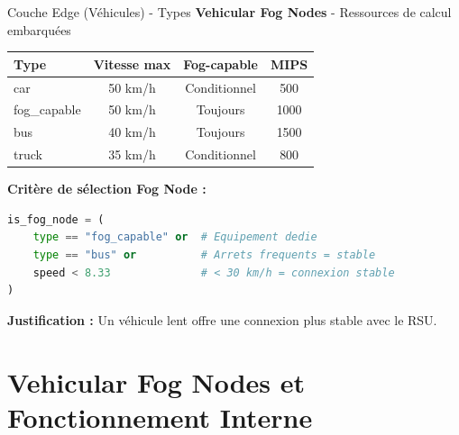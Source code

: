 ﻿\documentclass[aspectratio=169,11pt]{beamer}
\begin{document}
\begin{frame}[fragile]{Couche Edge (V\'ehicules) - Types}
\textbf{Vehicular Fog Nodes} - Ressources de calcul embarqu\'ees

\begin{table}
\centering
\begin{tabular}{lccc}
\toprule
\textbf{Type} & \textbf{Vitesse max} & \textbf{Fog-capable} & \textbf{MIPS} \\
\midrule
car & 50 km/h & Conditionnel & 500 \\
fog\_capable & 50 km/h & Toujours & 1000 \\
bus & 40 km/h & Toujours & 1500 \\
truck & 35 km/h & Conditionnel & 800 \\
\bottomrule
\end{tabular}
\end{table}

\textbf{Crit\`ere de s\'election Fog Node :}
\begin{lstlisting}[language=Python]
is_fog_node = (
    type == "fog_capable" or  # Equipement dedie
    type == "bus" or          # Arrets frequents = stable
    speed < 8.33              # < 30 km/h = connexion stable
)
\end{lstlisting}

\textbf{Justification :} Un v\'ehicule lent offre une connexion plus stable avec le RSU.
\end{frame}

\section{Vehicular Fog Nodes et Fonctionnement Interne}
\end{document}
